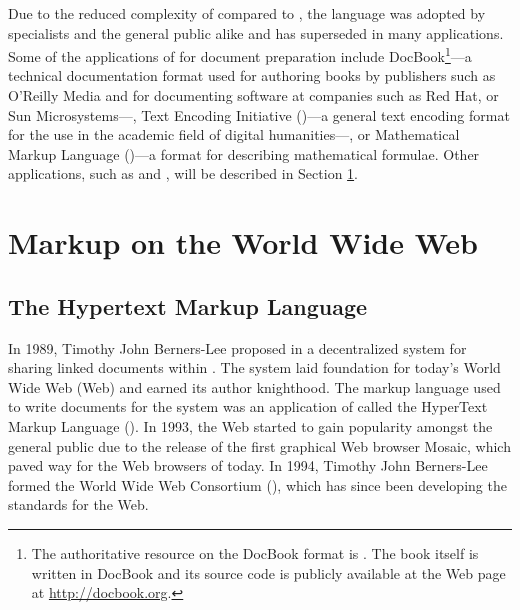 \documentclass{book}
\begin{document}
        Due to the reduced complexity of  compared to
        , the language was adopted by specialists and the general
        public alike and has superseded  in many applications.
        Some of the applications of  for document
        preparation include DocBook\footnote{
          The authoritative resource on the DocBook  format is
          \cite{walsh10}. The book itself is written in DocBook and its source
          code is publicly available at the Web page at
          \url{http://docbook.org}.
        }---a technical documentation format used for authoring books by
        publishers such as O'Reilly Media and for documenting software at
        companies such as Red Hat,  or Sun Microsystems---,
        Text Encoding Initiative ()---a general text encoding
        format for the use in the academic field of digital humanities---,
        or Mathematical Markup Language ()---a format for
        describing mathematical formulae. Other  applications, such
        as  and , will be described in Section
        \ref{sec:www-markup}.
        
      \section{Markup on the World Wide Web}\label{sec:www-markup}
      \subsection{The Hypertext Markup Language}
        In 1989, Timothy John Berners-Lee proposed in \cite{bernerslee89} a
        decentralized system for sharing linked documents within .
        The system laid foundation for today's World Wide Web (Web) and earned
        its author knighthood. The markup language used to write documents for
        the system was an application of  called the HyperText
        Markup Language (). In 1993, the Web started to gain
        popularity amongst the general public due to the release of the first
        graphical Web browser Mosaic, which paved way for the Web browsers of
        today. In 1994, Timothy John Berners-Lee formed the World Wide Web
        Consortium (), which has since been developing the
        standards for the Web.
        
\end{document}
